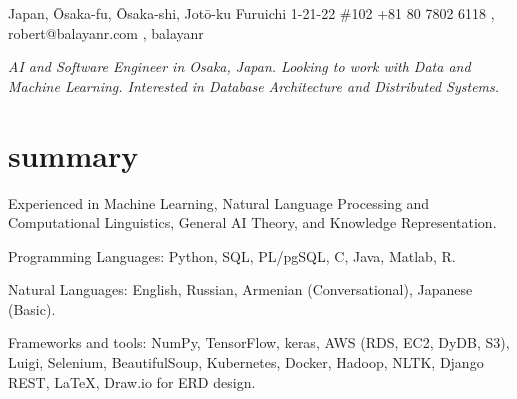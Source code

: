 \documentclass[]{cv-roald}
\begin{document}
\pagestyle{empty} %

{\faMapMarker \hspace{\FAspace} Japan, Ōsaka-fu, Ōsaka-shi, Jotō-ku Furuichi 1-21-22 \#102}
{\faMobile \hspace{\FAspace} +81 80 7802 6118 \sep 
\href{mailto:robert@balayanr.com}{\faEnvelope} \hspace{\FAspace} \faSkype\hspace{\FAspace} robert@balayanr.com \sep 
\href{https://www.linkedin.com/in/balayanr/}{\faLinkedinSquare} \hspace{\FAspace} \href{https://github.com/balayanr}{\faGithub} \hspace{\FAspace} \href{https://www.facebook.com/balayanr}{\faFacebookSquare} \hspace{\FAspace}\href{https://vk.com/yahhh_gf}{\faVk} \hspace{\FAspace} balayanr \FAspace  %
}
\hypersetup{
    urlcolor=darkermain
}


\textit{AI and Software Engineer in Osaka, Japan. Looking to work with Data and Machine Learning. Interested in Database Architecture and Distributed Systems.}

\section*{summary}
\begin{tabitemize}
    \item Experienced in Machine Learning, Natural Language Processing and Computational Linguistics, General AI Theory, and Knowledge Representation.
    \item Programming Languages: Python, SQL, PL/pgSQL, C, Java, Matlab, R.
    \item Natural Languages: English, Russian, Armenian (Conversational), Japanese (Basic).
    \item Frameworks and tools: NumPy, TensorFlow, keras, AWS (RDS, EC2, DyDB, S3), Luigi, Selenium, BeautifulSoup, Kubernetes, Docker, Hadoop, NLTK, Django REST, \LaTeX, Draw.io for ERD design.
\end{tabitemize}
\end{document}
